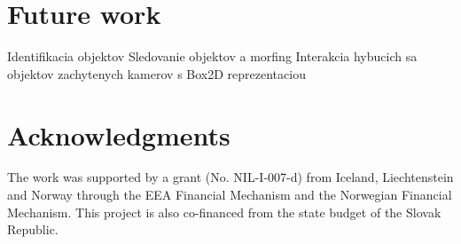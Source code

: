 \documentclass{ifacconf}
\begin{document}
\section{Future work}
Identifikacia objektov
Sledovanie objektov a morfing 
Interakcia hybucich sa objektov zachytenych kamerov s Box2D reprezentaciou

\section*{Acknowledgments}
The work was supported by a grant (No. NIL-I-007-d) from Iceland, Liechtenstein 
and Norway through the EEA Financial Mechanism and the Norwegian Financial 
Mechanism. This project is also co-financed from the state budget of the Slovak
Republic.


%
\end{document}

